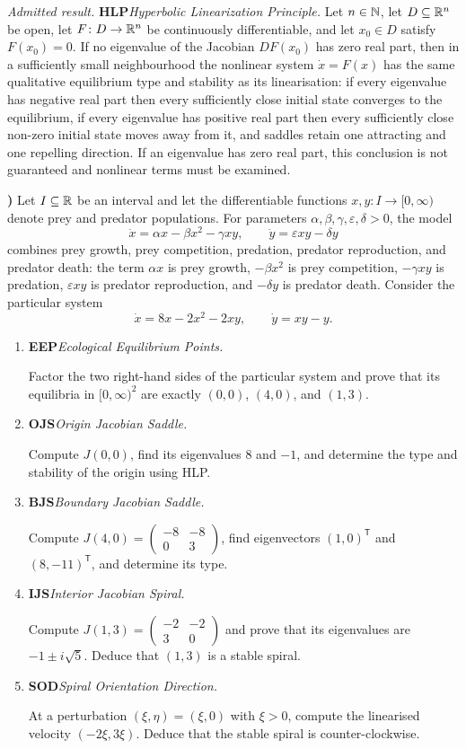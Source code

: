 \documentclass[10pt,a4paper]{article}
\newcounter{examquestion}
\newcommand{\examquestion}[1]{%
  \Needspace{5\baselineskip}%
  \refstepcounter{examquestion}%
  \par\addvspace{0.8\baselineskip}%
  \noindent\textbf{\theexamquestion)}\enspace #1\par
}
\newenvironment{subquestions}
  {\begin{enumerate}[label=\alph*),leftmargin=2.1em]}
  {\end{enumerate}}
\newcommand{\nameditem}[2]{%
  \textbf{\textsf{#1}}\enspace\emph{#2.}\enspace
}
\newcommand{\admitted}[3]{%
  \par\smallskip\noindent\emph{Admitted result.}\enspace
  \nameditem{#1}{#2}#3\par
}
\begin{document}
\admitted{HLP}{Hyperbolic Linearization Principle}{Let $n\in\mathbb{N}$, let
$D\subseteq\mathbb{R}^n$ be open, let $F\colon D\to\mathbb{R}^n$ be continuously
differentiable, and let
$x_0\in D$ satisfy $F(x_0)=0$.  If no eigenvalue of the Jacobian $DF(x_0)$
has zero real part, then in a sufficiently small neighbourhood the nonlinear
system $\dot x=F(x)$ has the same qualitative equilibrium type and stability
as its linearisation: if every eigenvalue has negative real part then every
sufficiently close initial state converges to the equilibrium, if every
eigenvalue has positive real part then every sufficiently close non-zero
initial state moves away from it, and saddles retain one attracting and one
repelling direction.  If an eigenvalue has zero
real part, this conclusion is not guaranteed and nonlinear terms must be
examined.}

\examquestion{\label{q:predator-prey}
Let $I\subseteq\mathbb{R}$ be an interval and let the differentiable functions
$x,y\colon I\to[0,\infty)$ denote prey and predator populations.  For
parameters $\alpha,\beta,\gamma,\varepsilon,\delta>0$, the model
\[
  \dot x=\alpha x-\beta x^2-\gamma xy,\qquad
  \dot y=\varepsilon xy-\delta y
\]
combines prey growth, prey competition, predation, predator reproduction,
and predator death: the term $\alpha x$ is prey growth, $-\beta x^2$ is
prey competition, $-\gamma xy$ is predation, $\varepsilon xy$ is predator
reproduction, and $-\delta y$ is predator death.  Consider the particular
system
\[
  \dot x=8x-2x^2-2xy,\qquad \dot y=xy-y.
\]
\begin{subquestions}
  \item \nameditem{EEP}{Ecological Equilibrium Points}
  Factor the two right-hand sides of the particular system and prove that
  its equilibria in $[0,\infty)^2$ are exactly
  $(0,0)$, $(4,0)$, and $(1,3)$.

  \item \nameditem{OJS}{Origin Jacobian Saddle}
  Compute $J(0,0)$, find its eigenvalues $8$ and $-1$, and determine the
  type and stability of the origin using HLP.

  \item \nameditem{BJS}{Boundary Jacobian Saddle}
  Compute
  $J(4,0)=\begin{pmatrix}-8&-8\\0&3\end{pmatrix}$, find eigenvectors
  $(1,0)^{\mathsf T}$ and $(8,-11)^{\mathsf T}$, and determine its type.

  \item \nameditem{IJS}{Interior Jacobian Spiral}
  Compute
  $J(1,3)=\begin{pmatrix}-2&-2\\3&0\end{pmatrix}$ and prove that its
  eigenvalues are $-1\pm i\sqrt5$.  Deduce that $(1,3)$ is a stable spiral.

  \item \nameditem{SOD}{Spiral Orientation Direction}
  At a perturbation $(\xi,\eta)=(\xi,0)$ with $\xi>0$, compute the
  linearised velocity $(-2\xi,3\xi)$.  Deduce that the stable spiral is
  counter-clockwise.
\end{subquestions}}
\end{document}
